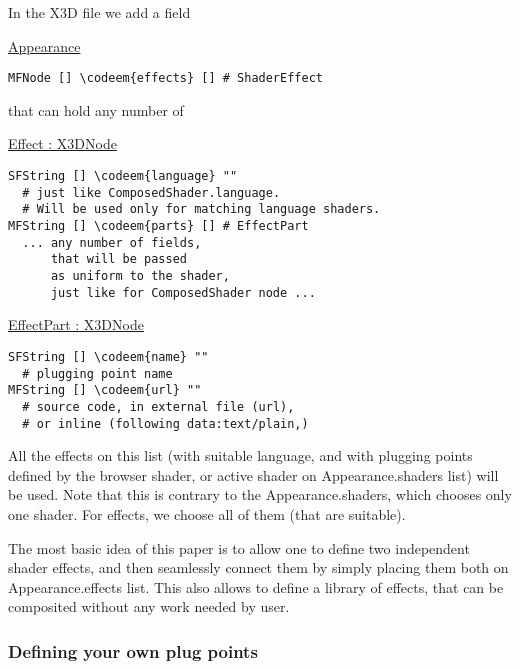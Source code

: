 \documentclass{acmsiggraph}                     %
\newenvironment{mycode}
{\begin{mycodecore}}
{\end{mycodecore}
\vspace{-0.1in}}
\newcommand*{\codeem}[1]{\textbf{#1}}
\begin{document}
In the X3D file we add a field

\begin{mycode}
\underline{Appearance}
\begin{Verbatim}[commandchars=\\\{\}]
MFNode [] \codeem{effects} [] # ShaderEffect
\end{Verbatim}
\end{mycode}

that can hold any number of

\begin{mycode}
\underline{Effect : X3DNode}
\begin{Verbatim}[commandchars=\\\{\}]
SFString [] \codeem{language} ""
  # just like ComposedShader.language.
  # Will be used only for matching language shaders.
MFString [] \codeem{parts} [] # EffectPart
  ... any number of fields,
      that will be passed
      as uniform to the shader,
      just like for ComposedShader node ...
\end{Verbatim}
\end{mycode}

\begin{mycode}
\underline{EffectPart : X3DNode}
\begin{Verbatim}[commandchars=\\\{\}]
SFString [] \codeem{name} ""
  # plugging point name
MFString [] \codeem{url} ""
  # source code, in external file (url),
  # or inline (following data:text/plain,)
\end{Verbatim}
\end{mycode}

All the effects on this list (with suitable language, and with
plugging points defined by the browser shader, or active shader on
Appearance.shaders list) will be used. Note that this is contrary to
the Appearance.shaders, which chooses only one shader. For effects, we
choose all of them (that are suitable).

The most basic idea of this paper is to allow one to define two
independent shader effects, and then seamlessly connect them by simply
placing them both on Appearance.effects list. This also allows to
define a library of effects, that can be composited without any work
needed by user.

\subsubsection{Defining your own plug points}
\end{document}
